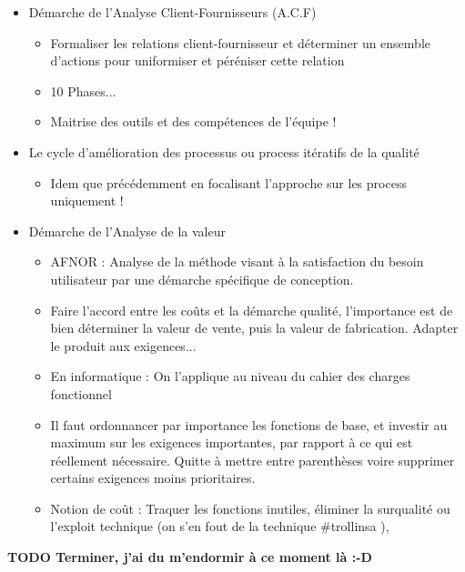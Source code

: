 \begin{itemize}
	\item Démarche de l’Analyse Client-Fournisseurs (A.C.F)
	\begin{itemize}
		\item Formaliser les relations client-fournisseur et déterminer un ensemble d'actions pour uniformiser et péréniser cette relation
		\item 10 Phases...
		\item  Maitrise des outils et des compétences de l’équipe !
	\end{itemize}


	\item Le cycle d’amélioration des processus ou process itératifs de la qualité
	\begin{itemize}
		\item Idem que précédemment en focalisant l’approche sur les process uniquement !
	\end{itemize}


	\item Démarche de l’Analyse de la valeur
	\begin{itemize}
		\item AFNOR : Analyse de la méthode visant à la satisfaction du besoin utilisateur par une démarche spécifique de conception.
		\item Faire l’accord entre les coûts et la démarche qualité, l’importance est de bien déterminer la valeur de vente, puis la valeur de fabrication. Adapter le produit aux exigences...
		\item En informatique : On l’applique au niveau du cahier des charges fonctionnel
		\item Il faut ordonnancer par importance les fonctions de base, et investir au maximum sur les exigences importantes, par rapport à ce qui est réellement nécessaire. Quitte à mettre entre parenthèses voire supprimer certains exigences moins prioritaires.
		\item Notion de coût : Traquer les fonctions inutiles, éliminer la surqualité ou l’exploit technique (on s’en fout de la technique \#trollinsa ),
	\end{itemize}

\end{itemize}

   
\textbf{TODO Terminer, j’ai du m’endormir à ce moment là :-D}
